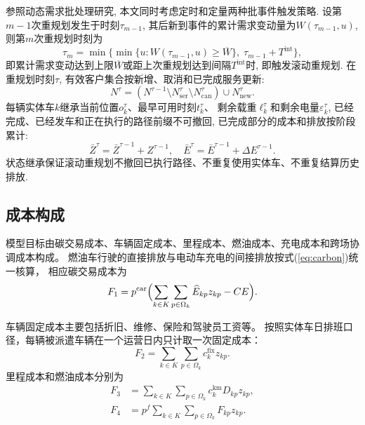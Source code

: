 \documentclass{setp-new}
\begin{document}
参照动态需求批处理研究\cite{ref:18,ref:71},
本文同时考虑定时和定量两种批事件触发策略.
设第$m-1$次重规划发生于时刻$\tau_{m-1}$,
其后新到事件的累计需求变动量为$W(\tau_{m-1},u)$,
则第$m$次重规划时刻为
\begin{equation}
\tau_m=\min\bigl\{\min\{u:W(\tau_{m-1},u)\ge\overline W\},\;\tau_{m-1}+T^{\mathrm{int}}\bigr\},
\label{eq:trigger}
\end{equation}
即累计需求变动达到上限$\overline W$或距上次重规划达到间隔$T^{\mathrm{int}}$时, 即触发滚动重规划.
在重规划时刻$\tau$, 有效客户集合按新增、取消和已完成服务更新:
\begin{equation}
N^\tau=(N^{\tau-1}\setminus N_{\mathrm{ser}}^\tau\setminus N_{\mathrm{can}}^\tau)\cup N_{\mathrm{new}}^\tau.
\label{eq:customer_update}
\end{equation}
每辆实体车$k$继承当前位置$o_k^\tau$、最早可用时刻$t_k^\tau$、
剩余载重$\ell_k^\tau$和剩余电量$\varepsilon_k^\tau$,
已经完成、已经发车和正在执行的路径前缀不可撤回,
已完成部分的成本和排放按阶段累计:
\begin{equation}
\bar Z^\tau=\bar Z^{\tau-1}+Z^{\tau-1},\quad
\bar E^\tau=\bar E^{\tau-1}+\Delta E^{\tau-1}.
\label{eq:accumulation}
\end{equation}
状态继承保证滚动重规划不撤回已执行路径、不重复使用实体车、不重复结算历史排放.

\subsection{成本构成}

模型目标由碳交易成本、车辆固定成本、里程成本、燃油成本、充电成本和跨场协调成本构成。
燃油车行驶的直接排放与电动车充电的间接排放按式(\ref{eq:carbon})统一核算，
相应碳交易成本为
\begin{equation}
F_1=p^{\mathrm{car}}\Bigl(\sum_{k\in K}\sum_{p\in\Omega_k}\widehat E_{kp}z_{kp}-CE\Bigr).
\label{eq:F1}
\end{equation}

车辆固定成本主要包括折旧、维修、保险和驾驶员工资等。
按照实体车日排班口径，每辆被派遣车辆在一个运营日内只计取一次固定成本\cite{ref:23,ref:48}：
\begin{equation}
F_2=\sum_{k\in K}\sum_{p\in\Omega_k}c_k^{\mathrm{fix}}z_{kp}.
\label{eq:F2}
\end{equation}
里程成本和燃油成本分别为
\begin{align}
F_3&=\sum_{k\in K}\sum_{p\in\Omega_k}c_k^{\mathrm{km}}D_{kp}z_{kp}, \label{eq:F3}\\
F_4&=p^f\sum_{k\in K}\sum_{p\in\Omega_k}F_{kp}z_{kp}. \label{eq:F4}
\end{align}
\end{document}
